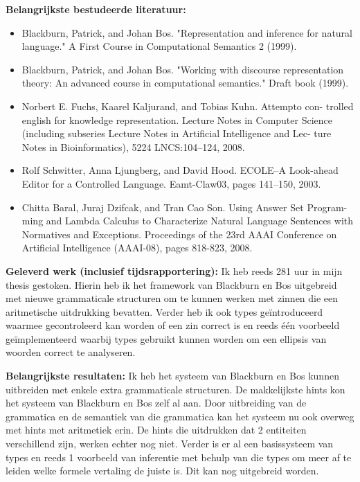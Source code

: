 \documentclass[12pt]{report}
\begin{document}
\vspace{1cm}
{\bf Belangrijkste bestudeerde literatuur:}
\begin{itemize}
  \item Blackburn, Patrick, and Johan Bos. "Representation and inference for natural language." A First Course in Computational Semantics 2 (1999).
  \item Blackburn, Patrick, and Johan Bos. "Working with discourse representation theory: An advanced course in computational semantics." Draft book (1999).
  \item Norbert E. Fuchs, Kaarel Kaljurand, and Tobias Kuhn. Attempto con- trolled english for knowledge representation. Lecture Notes in Computer Science (including subseries Lecture Notes in Artificial Intelligence and Lec- ture Notes in Bioinformatics), 5224 LNCS:104–124, 2008.
  \item Rolf Schwitter, Anna Ljungberg, and David Hood. ECOLE–A Look-ahead Editor for a Controlled Language. Eamt-Claw03, pages 141–150, 2003.
  \item Chitta Baral, Juraj Dzifcak, and Tran Cao Son. Using Answer Set Program- ming and Lambda Calculus to Characterize Natural Language Sentences with Normatives and Exceptions. Proceedings of the 23rd AAAI Conference on Artificial Intelligence (AAAI-08), pages 818-823, 2008.
\end{itemize}

\vspace{1cm}
{\bf Geleverd werk (inclusief tijdsrapportering):}
Ik heb reeds 281 uur in mijn thesis gestoken. Hierin heb ik het framework van Blackburn en Bos uitgebreid met nieuwe grammaticale structuren om te kunnen werken met zinnen die een aritmetische uitdrukking bevatten. Verder heb ik ook types geïntroduceerd waarmee gecontroleerd kan worden of een zin correct is en reeds één voorbeeld geïmplementeerd waarbij types gebruikt kunnen worden om een ellipsis van woorden correct te analyseren.

\vspace{1cm}
{\bf Belangrijkste resultaten:}
Ik heb het systeem van Blackburn en Bos kunnen uitbreiden met enkele extra grammaticale structuren. De makkelijkste hints kon het systeem van Blackburn en Bos zelf al aan. Door uitbreiding van de grammatica en de semantiek van die grammatica kan het systeem nu ook overweg met hints met aritmetiek erin. De hints die uitdrukken dat 2 entiteiten verschillend zijn, werken echter nog niet.
Verder is er al een basissysteem van types en reeds 1 voorbeeld van inferentie met behulp van die types om meer af te leiden welke formele vertaling de juiste is. Dit kan nog uitgebreid worden.
\end{document}
